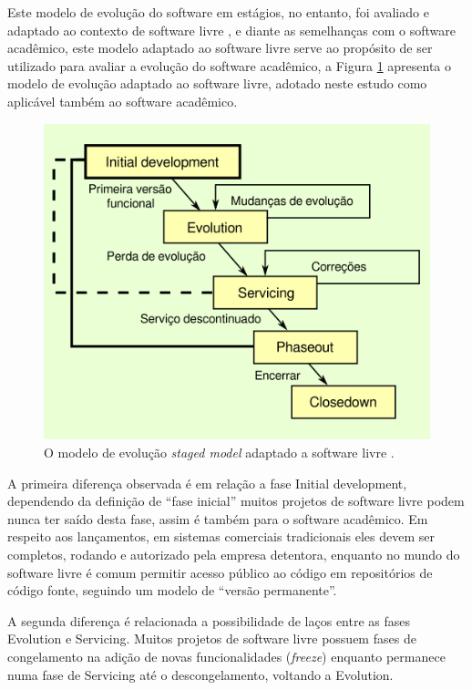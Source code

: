 Este modelo de evolução do software em estágios, no entanto, foi avaliado e adaptado
ao contexto de software livre \cite{capiluppi2007adapting}, e diante as
semelhanças com o software acadêmico, este modelo adaptado ao software livre serve ao propósito de ser
utilizado para
avaliar a evolução do software acadêmico, a Figura \ref{staged-model-foss-cycle}
apresenta o modelo de evolução adaptado ao software livre, adotado
neste estudo como aplicável também ao software acadêmico.

\begin{figure}[h]
  \center
  \includegraphics[scale=0.6]{imagens/staged-model-foss-cycle.png}
  \caption{O modelo de evolução {\it staged model} adaptado a software livre \cite{capiluppi2007adapting}.}
  \label{staged-model-foss-cycle}
\end{figure}

A primeira diferença observada é em relação a fase Initial development,
dependendo da definição de ``fase inicial'' muitos projetos de software livre
podem nunca ter saído desta fase, assim é também para o software acadêmico. Em respeito aos lançamentos,
em sistemas comerciais tradicionais eles devem ser completos, rodando e autorizado
pela empresa detentora, enquanto no mundo do software livre é comum
permitir acesso público ao código em repositórios de código fonte, seguindo
um modelo de ``versão permanente''.

A segunda diferença é relacionada a possibilidade de laços entre
as fases Evolution e Servicing. Muitos projetos de software livre
possuem fases de congelamento na adição de novas funcionalidades ({\it freeze})
enquanto permanece numa fase de Servicing até o descongelamento, voltando
a Evolution.

